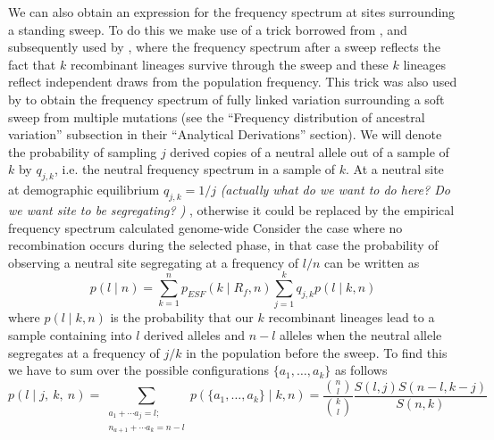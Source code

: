 \documentclass[a4paper,10pt]{article}
\newcommand{\gc}[1]{{\it \color{red} (#1)} }
\begin{document}
We can also obtain an expression for the frequency spectrum at sites surrounding a standing sweep. To do this we make use of a trick borrowed from \cite{Kimandstephan}, and subsequently used by \cite{NielsenKimetc}, where the frequency spectrum after a sweep reflects the fact that $k$ recombinant lineages survive through the sweep and these $k$ lineages reflect independent draws from the population frequency. This trick was also used by \cite{Pennings:2006fs} to obtain the frequency spectrum of fully linked variation surrounding a soft sweep from multiple mutations (see the ``Frequency distribution of ancestral variation'' subsection in their ``Analytical Derivations'' section). We will denote the probability of sampling $j$ derived copies of a neutral allele out of a sample of $k$ by $q_{j,k}$, i.e. the neutral frequency spectrum in a sample of $k$. At a neutral site at demographic equilibrium $q_{j,k} = 1/j$ \gc{actually what do we want to do here? Do we want site to be segregating? }, otherwise it could be replaced by the empirical frequency spectrum calculated genome-wide \citep[as in ][]{NielsenKimetc}
Consider the case where no recombination occurs during the selected phase, in that case the probability of observing a neutral site segregating at a frequency of $l/n$ can be written as
\begin{equation}
p(l \mid n) =  \sum_{k=1}^{n}  p_{ESF}(k \mid R_f,n)  \sum_{j=1}^{k} q_{j,k}  p(l \mid k,n) 
\end{equation}
where $  p(l \mid k,n) $ is the probability that our $k$ recombinant lineages lead to a sample containing into $l$ derived alleles and $n-l$ alleles when the neutral allele segregates at a frequency of $j/k$ in the population before the sweep. To find this we have to sum over the possible configurations $\{a_1,\dots,a_k\}$ as follows
\begin{equation}
p(l \mid j, ~k,~n) = 
\sum_{\substack{a_1+\cdots a_j=l;\\
    n_{a+1}+\cdots a_k=n-l}} 
p(\{a_1,\dots,a_k\} \mid k, n) = \frac{ {n \choose l} }{ {k \choose l} }\frac{ S(l,j)  S(n-l,k-j)  }{ S(n,k) } \label{ESF_gives_freq_spec}
\end{equation}
\end{document}

